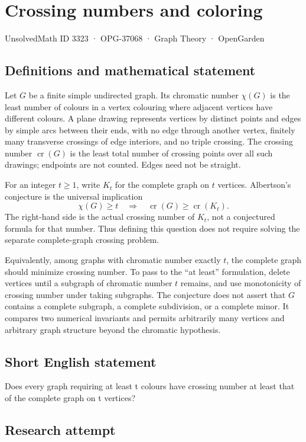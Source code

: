 \documentclass[11pt,a4paper]{article}
\begin{document}
\section*{Crossing numbers and coloring}\label{3323}
{\small UnsolvedMath ID 3323 · OPG-37068 · Graph Theory · OpenGarden}
\subsection{Definitions and mathematical statement}
Let $G$ be a finite simple undirected graph. Its chromatic number
$\chi(G)$ is the least number of colours in a vertex colouring
where adjacent vertices have different colours. A plane drawing
represents vertices by distinct points and edges by simple arcs
between their ends, with no edge through another vertex, finitely
many transverse crossings of edge interiors, and no triple crossing.
The crossing number $\operatorname{cr}(G)$ is the least total number
of crossing points over all such drawings; endpoints are not counted.
Edges need not be straight.

For an integer $t\ge1$, write $K_t$ for the complete graph on $t$
vertices. Albertson's conjecture is the universal implication
\[
                          \chi(G)\ge t
                 \quad\Longrightarrow\quad
                          \operatorname{cr}(G)\ge\operatorname{cr}(K_t).
\]
The right-hand side is the actual crossing number of $K_t$, not a
conjectured formula for that number. Thus defining this question
does not require solving the separate complete-graph crossing problem.

Equivalently, among graphs with chromatic number exactly $t$, the
complete graph should minimize crossing number. To pass to the
``at least'' formulation, delete vertices until a subgraph of
chromatic number $t$ remains, and use monotonicity of crossing number
under taking subgraphs. The conjecture does not assert that $G$
contains a complete subgraph, a complete subdivision, or a complete
minor. It compares two numerical invariants and permits arbitrarily
many vertices and arbitrary graph structure beyond the chromatic
hypothesis.
\subsection{Short English statement}
Does every graph requiring at least t colours have crossing number at least that of the complete graph on t vertices?
\subsection{Research attempt}
\end{document}
